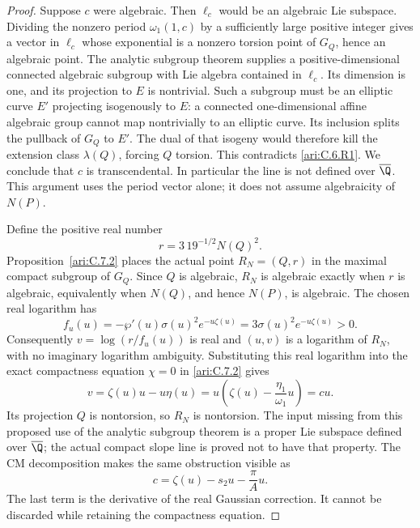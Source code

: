 \begin{proof}
Suppose $c$ were algebraic. Then $\ell_c$ would be an
algebraic Lie subspace. Dividing the nonzero period
$\omega_1(1,c)$ by a sufficiently large positive integer
gives a vector in $\ell_c$ whose exponential is a nonzero
torsion point of $G_Q$, hence an algebraic point. The
analytic subgroup theorem
\citep[Theorem 6.1]{huber2022} supplies a positive-dimensional
connected algebraic subgroup with Lie algebra contained in
$\ell_c$. Its dimension is one, and its projection to $E$
is nontrivial. Such a subgroup must be an elliptic curve
$E'$ projecting isogenously to $E$: a connected
one-dimensional affine algebraic group cannot map
nontrivially to an elliptic curve. Its inclusion splits the
pullback of $G_Q$ to $E'$. The dual of that isogeny would
therefore kill the extension class $\lambda(Q)$, forcing
$Q$ torsion. This contradicts \ref{ari:C.6.R1}. We conclude that $c$
is transcendental. In particular the line is not defined over
$\overline\Q$. This argument uses the period vector alone;
it does not assume algebraicity of $N(P)$.

Define the positive real number
\[
 r=3\,19^{-1/2}N(Q)^2.
\]
Proposition~\ref{ari:C.7.2} places the actual point $R_N=(Q,r)$
in the maximal compact subgroup of $G_Q$. Since $Q$ is algebraic,
$R_N$ is algebraic exactly when $r$ is algebraic, equivalently
when $N(Q)$, and hence $N(P)$, is algebraic. The chosen real
logarithm has
\[
 f_u(u)=-\wp'(u)\sigma(u)^2e^{-u\zeta(u)}
        =3\sigma(u)^2e^{-u\zeta(u)}>0.
\]
Consequently $v=\log(r/f_u(u))$ is real and
$(u,v)$ is a logarithm of $R_N$, with no imaginary logarithm
ambiguity. Substituting this real logarithm into the exact
compactness equation $\chi=0$ in \ref{ari:C.7.2} gives
\[
 v=\zeta(u)u-u\eta(u)
   =u\left(\zeta(u)-\frac{\eta_1}{\omega_1}u\right)=cu.
\]
Its projection $Q$ is nontorsion, so $R_N$ is nontorsion.
The input missing from this proposed use of the analytic
subgroup theorem is a proper Lie subspace defined over
$\overline\Q$; the actual compact slope line is proved
not to have that property. The CM decomposition makes the
same obstruction visible as
\[
 c=\zeta(u)-s_2u-\frac{\pi}{A}u.
\]
The last term is the derivative of the real Gaussian
correction. It cannot be discarded while retaining the
compactness equation.
\end{proof}